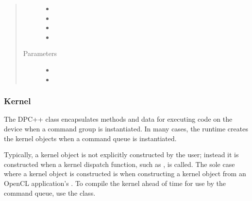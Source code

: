 \documentclass[letterpaper,10pt,english]{sphinxmanual}
\begin{document}
\begin{fulllineitems}
\begin{fulllineitems}
\begin{quote}
\begin{description}
\begin{itemize}
\item {} 
 \textendash{} 

\item {} 
 \textendash{} 

\item {} 
 \textendash{} 

\item {} 
 \textendash{} 

\end{itemize}

\item[{Parameters}] \leavevmode\begin{itemize}
\item {} 
 \textendash{} 

\item {} 
 \textendash{} 

\end{itemize}

\end{description}\end{quote}

\end{fulllineitems}


\end{fulllineitems}



\subsubsection{Kernel}
\label{\detokenize{programming-interface/parallelism/kernel:kernel}}\label{\detokenize{programming-interface/parallelism/kernel:id1}}\label{\detokenize{programming-interface/parallelism/kernel::doc}}
The DPC++  class encapsulates methods and data for executing
code on the device when a command group is instantiated. In many cases,
the runtime creates the kernel objects when a command queue is
instantiated.

Typically, a kernel object is not explicitly constructed by the user;
instead it is constructed when a kernel dispatch function, such as
, is called. The sole case where a kernel object is
constructed is when constructing a kernel object from an OpenCL
application’s . To compile the kernel ahead of time for use
by the command queue, use the
 class.
\end{document}

